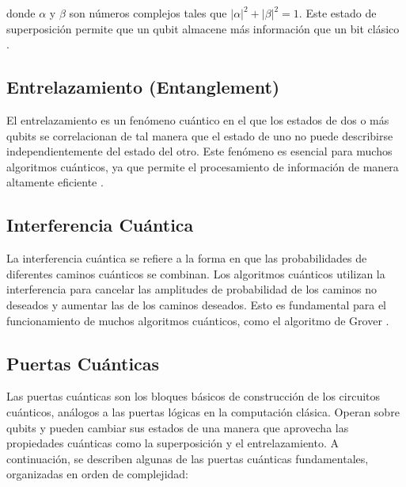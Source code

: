 \documentclass[11pt,a4paper,spanish]{book}
\begin{document}
donde \(\alpha\) y \(\beta\) son números complejos tales que \(|\alpha|^2 + |\beta|^2 = 1\). Este estado de superposición permite que un qubit almacene más información que un bit clásico \cite{nielsenChuang}.

\subsection{Entrelazamiento (Entanglement)}

El entrelazamiento es un fenómeno cuántico en el que los estados de dos o más qubits se correlacionan de tal manera que el estado de uno no puede describirse independientemente del estado del otro. Este fenómeno es esencial para muchos algoritmos cuánticos, ya que permite el procesamiento de información de manera altamente eficiente \cite{nielsenChuang}.

\subsection{Interferencia Cuántica}

La interferencia cuántica se refiere a la forma en que las probabilidades de diferentes caminos cuánticos se combinan. Los algoritmos cuánticos utilizan la interferencia para cancelar las amplitudes de probabilidad de los caminos no deseados y aumentar las de los caminos deseados. Esto es fundamental para el funcionamiento de muchos algoritmos cuánticos, como el algoritmo de Grover \cite{groverAlgorithm}.

\subsection{Puertas Cuánticas}

Las puertas cuánticas son los bloques básicos de construcción de los circuitos cuánticos, análogos a las puertas lógicas en la computación clásica. Operan sobre qubits y pueden cambiar sus estados de una manera que aprovecha las propiedades cuánticas como la superposición y el entrelazamiento. A continuación, se describen algunas de las puertas cuánticas fundamentales, organizadas en orden de complejidad:
\end{document}

